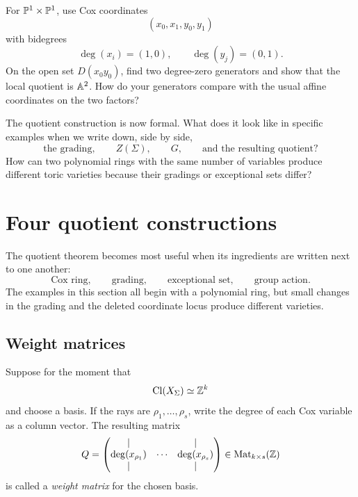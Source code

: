 \begin{pauseandthink}
For \(\mathbb{P}^1\times\mathbb{P}^1\), use Cox coordinates
\[
(x_0,x_1,y_0,y_1)
\]
with bidegrees
\[
\deg(x_i)=(1,0),
\qquad
\deg(y_j)=(0,1).
\]
On the open set \(D(x_0y_0)\), find two degree-zero generators and
show that the local quotient is \(\mathbb{A}^2\). How do your generators
compare with the usual affine coordinates on the two factors?
\end{pauseandthink}

\begin{guidingquestion}
The quotient construction is now formal. What does it look like in
specific examples when we write down, side by side,
\[
\text{the grading},
\qquad
Z(\Sigma),
\qquad
G,
\qquad
\text{and the resulting quotient}?
\]
How can two polynomial rings with the same number of variables produce
different toric varieties because their gradings or exceptional sets
differ?
\end{guidingquestion}

\section{Four quotient constructions}
\label{sec:four-cox-quotient-examples}

The quotient theorem becomes most useful when its ingredients are
written next to one another:
\[
\text{Cox ring},
\qquad
\text{grading},
\qquad
\text{exceptional set},
\qquad
\text{group action}.
\]
The examples in this section all begin with a polynomial ring, but
small changes in the grading and the deleted coordinate locus produce
different varieties.

\subsection{Weight matrices}

Suppose for the moment that
\[
\operatorname{Cl}(X_\Sigma)\simeq\mathbb{Z}^k
\]
and choose a basis. If the rays are
\(\rho_1,\dots,\rho_s\), write the degree of each Cox variable as a
column vector. The resulting matrix
\[
Q=
\begin{pmatrix}
|&&|\\
\deg(x_{\rho_1})&\cdots&\deg(x_{\rho_s})\\
|&&|
\end{pmatrix}
\in\operatorname{Mat}_{k\times s}(\mathbb{Z})
\]
is called a \emph{weight matrix} for the chosen basis.

